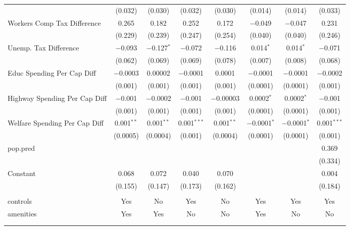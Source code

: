 \begin{table}[!htbp]
\begin{tabular}{@{\extracolsep{5pt}}lccccccc}
  & (0.032) & (0.030) & (0.032) & (0.030) & (0.014) & (0.014) & (0.033) \\ 
  Workers Comp Tax Difference & 0.265 & 0.182 & 0.252 & 0.172 & $-$0.049 & $-$0.047 & 0.231 \\ 
  & (0.229) & (0.239) & (0.247) & (0.254) & (0.040) & (0.040) & (0.246) \\ 
  Unemp. Tax Difference & $-$0.093 & $-$0.127$^{*}$ & $-$0.072 & $-$0.116 & 0.014$^{*}$ & 0.014$^{*}$ & $-$0.071 \\ 
  & (0.062) & (0.069) & (0.069) & (0.078) & (0.007) & (0.008) & (0.068) \\ 
  Educ Spending Per Cap Diff & $-$0.0003 & 0.00002 & $-$0.0001 & 0.0001 & $-$0.0001 & $-$0.0001 & $-$0.0002 \\ 
  & (0.001) & (0.001) & (0.001) & (0.001) & (0.0001) & (0.0001) & (0.001) \\ 
  Highway Spending Per Cap Diff & $-$0.001 & $-$0.0002 & $-$0.001 & $-$0.00003 & 0.0002$^{*}$ & 0.0002$^{*}$ & $-$0.001 \\ 
  & (0.001) & (0.001) & (0.001) & (0.001) & (0.0001) & (0.0001) & (0.001) \\ 
  Welfare Spending Per Cap Diff & 0.001$^{**}$ & 0.001$^{**}$ & 0.001$^{***}$ & 0.001$^{**}$ & $-$0.0001$^{*}$ & $-$0.0001$^{*}$ & 0.001$^{***}$ \\ 
  & (0.0005) & (0.0004) & (0.001) & (0.0004) & (0.0001) & (0.0001) & (0.001) \\ 
  pop.pred &  &  &  &  &  &  & 0.369 \\ 
  &  &  &  &  &  &  & (0.334) \\ 
  Constant & 0.068 & 0.072 & 0.040 & 0.070 &  &  & 0.004 \\ 
  & (0.155) & (0.147) & (0.173) & (0.162) &  &  & (0.184) \\ 
 \hline \\[-1.8ex] 
controls & Yes & No & Yes & No & Yes & Yes & Yes \\ 
amenities & Yes & Yes & No & No & Yes & No & No \\ 
\hline \\[-1.8ex] 
\hline 
\hline \\[-1.8ex] 
\end{tabular} 
\end{table} 
